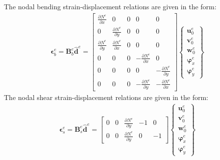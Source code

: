 \documentclass[a4paper,fleqn]{cas-sc}
\begin{document}
The nodal bending strain-displacement relations are given in the form:
\begin{eqnarray}
	\boldsymbol{\epsilon}_b^e =
	\textbf{B}_b^e\widehat{\textbf{d}}^e = 
	\left [
	\begin{array}{ccccc}
		\frac{\partial N^e}{\partial x} & 0 & 0 & 0 & 0\\
		0 & \frac{\partial N^e}{\partial y} & 0 & 0 & 0\\
		\frac{\partial N^e}{\partial y} & \frac{\partial N^e}{\partial x} & 0 & 0 & 0\\
		0 & 0 & 0 & -\frac{\partial N^e}{\partial x} & 0\\
		0 & 0 & 0 & 0 & -\frac{\partial N^e}{\partial y}\\
		0 & 0 & 0 & -\frac{\partial N^e}{\partial y} & -\frac{\partial N^e}{\partial x}
	\end{array} \right]
	\left \{ \begin{array}{c}
		\textbf{u}_0^e \\
		\textbf{v}_0^e \\
		\textbf{w}_0^e \\
		\boldsymbol{\varphi}_x^e \\
		\boldsymbol{\varphi}_y^e
	\end{array} \right\}
\end{eqnarray}
The nodal shear strain-displacement relations are given in the form:
\begin{eqnarray}
	\boldsymbol{\epsilon}_s^e =
	\textbf{B}_s^e\widehat{\textbf{d}}^e = 
	\left [
	\begin{array}{ccccc}
		0 & 0 & \frac{\partial N^e}{\partial y} & -1 & 0\\
		0 & 0 & \frac{\partial N^e}{\partial y} & 0 & -1
	\end{array} \right]
	\left \{ \begin{array}{c}
		\textbf{u}_0^e \\
		\textbf{v}_0^e \\
		\textbf{w}_0^e \\
		\boldsymbol{\varphi}_x^e \\
		\boldsymbol{\varphi}_y^e
	\end{array} \right\}
\end{eqnarray}
\end{document}
